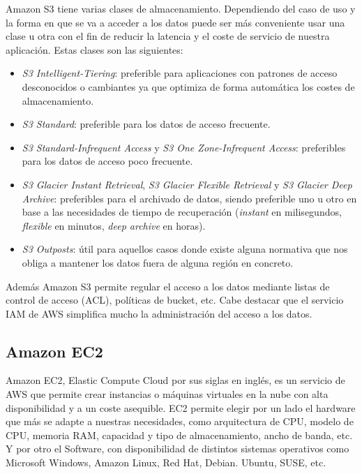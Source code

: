 Amazon S3 tiene varias clases de almacenamiento. Dependiendo del caso de uso y la forma en que se va a acceder a los datos puede ser más conveniente usar una clase u otra con el fin de reducir la latencia y el coste de servicio de nuestra aplicación. Estas clases son las siguientes:
\begin{itemize}
    \item \textit{S3 Intelligent-Tiering}: preferible para aplicaciones con patrones de acceso desconocidos o cambiantes ya que optimiza de forma automática los costes de almacenamiento.
    \item \textit{S3 Standard}: preferible para los datos de acceso frecuente.
    \item \textit{S3 Standard-Infrequent Access} y \textit{S3 One Zone-Infrequent Access}: preferibles para los datos de acceso poco frecuente.
    \item \textit{S3 Glacier Instant Retrieval}, \textit{S3 Glacier Flexible Retrieval} y \textit{S3 Glacier Deep Archive}: preferibles para el archivado de datos, siendo preferible uno u otro en base a las necesidades de tiempo de recuperación (\textit{instant} en milisegundos, \textit{flexible} en minutos, \textit{deep archive} en horas).
    \item \textit{S3 Outposts}: útil para aquellos casos donde existe alguna normativa que nos obliga a mantener los datos fuera de alguna región en concreto.
\end{itemize}

Además Amazon S3 permite regular el acceso a los datos mediante listas de control de acceso (ACL), políticas de bucket, etc. Cabe destacar que el servicio IAM de AWS simplifica mucho la administración del acceso a los datos.

\subsection{Amazon EC2}

Amazon EC2, Elastic Compute Cloud por sus siglas en inglés, es un servicio de AWS que permite crear instancias o máquinas virtuales en la nube con alta disponibilidad y a un coste asequible. EC2 permite elegir por un lado el hardware que más se adapte a nuestras necesidades, como arquitectura de CPU, modelo de CPU, memoria RAM, capacidad y tipo de almacenamiento, ancho de banda, etc. Y por otro el Software, con disponibilidad de distintos sistemas operativos como Microsoft Windows, Amazon Linux, Red Hat, Debian. Ubuntu, SUSE, etc.

